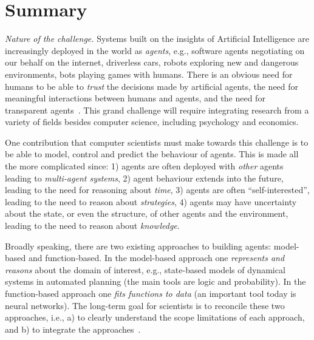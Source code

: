 \documentclass[10pt]{article}
\title{\TITLE}
\author{Sasha Rubin (Candidate XXXX)}
\begin{document}
\section{Summary}





\emph{Nature of the challenge.} Systems built on the insights of Artificial Intelligence are increasingly deployed in the world as \emph{agents}, 
e.g., software agents negotiating on our behalf on the internet, driverless cars,  
robots exploring new and dangerous environments, bots playing games with humans. There is an obvious need for humans to 
be able to \emph{trust} the decisions made by artificial agents, the need for {meaningful interactions} between humans and agents, 
and the need for {transparent} agents~\cite{ACMStatement17,Neumann17}. This grand challenge will require integrating research from a variety of fields 
besides computer science, including psychology and economics.
	
One contribution that computer scientists must make towards this challenge is to be able to model, control and predict the behaviour of agents. 
This is made 
all the more complicated since: 1) agents are often deployed with \emph{other} agents leading to \emph{multi-agent systems}, 2) agent behaviour extends into the future, leading to the need for reasoning about \emph{time}, 3)  agents are often ``self-interested'', leading to the need to reason about \emph{strategies}, 4)
agents may have uncertainty about the state, or even the structure, of other agents and the environment, leading to the need to reason about \emph{knowledge}.
 

Broadly speaking, there are two existing approaches to building agents: model-based and function-based. In the model-based approach one \emph{represents and reasons} about the domain of interest, e.g., state-based models of dynamical systems in automated planning (the main tools are logic and probability). 
In the function-based approach one \emph{fits functions to data} (an important tool today is neural networks).  
The long-term goal for scientists is to reconcile these two approaches, i.e., a) to clearly understand the scope limitations of each approach, and b) to integrate the approaches~\cite{Darwiche17}.
\end{document}
